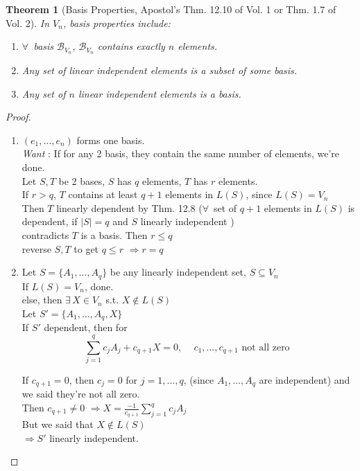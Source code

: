 \documentclass[twoside]{amsart}
\theoremstyle{plain}
\newtheorem{theorem}{Theorem}
\theoremstyle{definition}
\begin{document}
\begin{theorem}[Basis Properties, Apostol's Thm. 12.10 of Vol. 1 or Thm. 1.7 of Vol. 2]\label{T:basis_properties} In $V_n$, basis properties include:
\begin{enumerate}
  \item $\forall \, $ basis $\mathcal{B}_{V_n}$, $\mathcal{B}_{V_n}$ contains exactly $n$ elements.  
  \item Any set of linear independent elements is a subset of some basis.  
  \item Any set of $n$ linear independent elements is a basis.  
\end{enumerate}
\end{theorem}

\begin{proof} 
  \begin{enumerate}
\item $(e_1,\dots, e_n)$ forms one basis.   \medskip \\
  \emph{ Want }: If for any 2 basis, they contain the same number of elements, we're done.  \\
  Let $S,T$ be 2 bases, $S$ has $q$ elements, $T$ has $r$ elements.  \\
  \phantom{ Let } If $r >q$, $T$ contains at least $q+1$ elements in $L(S)$, since $L(S) = V_n$ \\
  \phantom{ Let If } Then $T$ linearly dependent by Thm. 12.8 ($\forall \, $ set of $q+1$ elements in $L(S)$ is dependent, if $|S| = q$ and $S$ linearly independent ) \\
  \phantom{ Let If Then } contradicts $T$ is a basis.  Then $r\leq q$  \medskip \\  
  reverse $S,T$ to get $q\leq r$ $\Longrightarrow r=q$  \\
\item Let $S= \{ A_1, \dots, A_q \}$ be any linearly independent set, $S \subseteq V_n$ \smallskip \\
  If $L(S) = V_n$, done.  \\
  \phantom{ If } else, then $\exists \, X \in V_n$ s.t. $X \notin L(S)$ \smallskip \\
  \phantom{ If else } Let $S' = \{ A_1, \dots, A_q, X \}$  \\
  \phantom{ If else Let } If $S'$ dependent, then for 
  \[
  \sum_{j=1}^q c_j A_j + c_{q+1}X = 0 , \quad \, c_1, \dots, c_{q+1} \text{ not all zero }
\]

If $c_{q+1} =0$, then $c_j = 0$ for $j=1,\dots, q$, (since $A_1, \dots, A_q$ are independent) and we said they're not all zero.  \medskip \\
Then $c_{q+1} \neq 0$ $\Longrightarrow X = \frac{-1}{ c_{q+1} } \sum_{j=1}^q c_j A_j$ \medskip \\
But we said that $X \notin L(S)$  \\ 
$\Longrightarrow S' $ linearly independent.  


\end{enumerate}
\end{proof}
\end{document}
